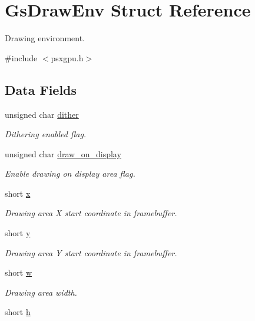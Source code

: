 \hypertarget{structGsDrawEnv}{}\section{Gs\+Draw\+Env Struct Reference}
\label{structGsDrawEnv}


Drawing environment.  




{\ttfamily \#include $<$psxgpu.\+h$>$}

\subsection*{Data Fields}
\begin{DoxyCompactItemize}
\item 
unsigned char \hyperlink{structGsDrawEnv_aaaed8f80f352d5e88563072418176aa3}{dither}
\begin{DoxyCompactList}\small\item\em Dithering enabled flag. \end{DoxyCompactList}\item 
unsigned char \hyperlink{structGsDrawEnv_a308c7cb65b6076160c23905b2946fcfe}{draw\+\_\+on\+\_\+display}
\begin{DoxyCompactList}\small\item\em Enable drawing on display area flag. \end{DoxyCompactList}\item 
short \hyperlink{structGsDrawEnv_a6fb0977769dc3447f2f1679dc99d1a86}{x}
\begin{DoxyCompactList}\small\item\em Drawing area X start coordinate in framebuffer. \end{DoxyCompactList}\item 
short \hyperlink{structGsDrawEnv_a9a6e3bb414996687c92f747fdaefd394}{y}
\begin{DoxyCompactList}\small\item\em Drawing area Y start coordinate in framebuffer. \end{DoxyCompactList}\item 
short \hyperlink{structGsDrawEnv_a1a0cd2e7dc81367a7020044f4552b3f5}{w}
\begin{DoxyCompactList}\small\item\em Drawing area width. \end{DoxyCompactList}\item 
short \hyperlink{structGsDrawEnv_a010f8d7cc07b6287f3b5cc33c772bbec}{h}

\end{DoxyCompactItemize}
